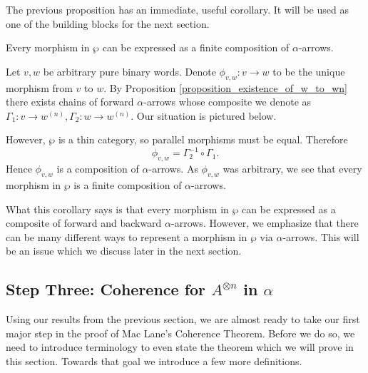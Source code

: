The previous proposition has an immediate, useful corollary. 
It will be used as one of the building blocks for the next section. 

\begin{corollary}\label{corollary:morphisms_of_wp}
    Every morphism in $\wp$ can be expressed as a finite composition 
    of $\alpha$-arrows.
\end{corollary}

\begin{prf}
    Let $v, w$ be arbitrary pure binary words. Denote $\phi_{v,w}: v \to w$ to be 
    the unique morphism from $v$ to $w$. By Proposition \ref{proposition_existence_of_w_to_wn}
    there exists chains of forward $\alpha$-arrows whose composite 
    we denote as $\Gamma_1: v \to w^{(n)}, \Gamma_2: w \to w^{(n)}$. Our situation is pictured
    below.
    \begin{center}
    \end{center}
    However, $\wp$ is a thin category, so parallel morphisms must be equal. Therefore
    \[
        \phi_{v,w} = \Gamma_2^{-1} \circ \Gamma_1.
    \] 
    Hence $\phi_{v,w}$ is a composition of $\alpha$-arrows. As $\phi_{v,w}$ 
    was arbitrary, we see that every morphism in $\wp$ 
    is a finite composition of $\alpha$-arrows.
\end{prf}
What this corollary says is that every morphism in $\wp$ can be expressed as a
composite of forward and backward $\alpha$-arrows. However, we emphasize that 
there can be many different ways to represent a morphism in $\wp$ via 
$\alpha$-arrows. This will be an issue which we discuss later in the next section.


\newpage
\subsection*{Step Three: Coherence for $A^{\otimes n}$ in $\alpha$}\label{section:associator_coherence}
Using our results from the previous section, we are almost ready to 
take our first major step in the proof of Mac Lane's Coherence 
Theorem. Before we do so, we need to introduce terminology to even state the theorem which we will prove in this section. 
Towards that goal we introduce a few more definitions. 

